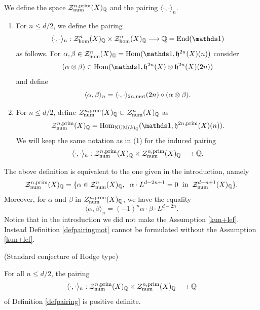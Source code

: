 \documentclass[11pt]{amsart}
\begin{document}
\begin{definition}\label{defpairing} We define  the space $\mathcal{Z}^{n,\mathrm{prim}}_{\mathrm{num}}(X)_{\mathbb{Q}} $  and the  pairing  $\langle \cdot, \cdot \rangle_{n}$.
\begin{enumerate}
\item For $n \leq d/2$, we  define the pairing
 \[\langle \cdot, \cdot \rangle_{n} : \mathcal{Z}^{n}_{\hom}(X)_{\Q}  \times  \mathcal{Z}^{n}_{\hom}(X)_{\Q}  \longrightarrow \Q=\End(\one)\]
as follows. For $\alpha, \beta  \in \mathcal{Z}^{n}_{\hom}(X)_{\Q}  = \Hom (\one, \mathfrak{h}^{2n}(X)(n))$ consider 
\[(\alpha \otimes \beta)  \in   \Hom (\one, \mathfrak{h}^{2n}(X) \otimes \mathfrak{h}^{2n}(X)(2n))\] and define
\[\langle \alpha, \beta \rangle_{n} =      \langle \cdot, \cdot \rangle_{2n,\mathrm{mot}} (2n) \circ  (\alpha \otimes \beta).\]

\item For $n \leq d/2$, define  $\mathcal{Z}^{n,\mathrm{prim}}_{\mathrm{num}}(X)_{\mathbb{Q}} \subset \mathcal{Z}^{n}_{\mathrm{num}}(X)_{\mathbb{Q}}$ as
 \[\mathcal{Z}^{n,\prim}_{\num}(X)_{\Q}  = \Hom_{\NUM(k)_\Q}(\one, \mathfrak{h}^{2n,\prim}(X)(n)).\]  We will keep the same notation as in (1) for the induced pairing
 \[\langle \cdot, \cdot \rangle_{n} : \mathcal{Z}^{n,\mathrm{prim}}_{\mathrm{num}}(X)_{\mathbb{Q}}  \times  \mathcal{Z}^{n,\mathrm{prim}}_{\mathrm{num}}(X)_{\mathbb{Q}}  \longrightarrow \mathbb{Q}.\]
\end{enumerate}
 \end{definition}
 \begin{remark}
The  above definition is equivalent to the one given in the introduction, namely 
\[\mathcal{Z}^{n,\mathrm{prim}}_{\mathrm{num}}(X)_{\mathbb{Q}} = \{\alpha \in \mathcal{Z}^{n}_{\mathrm{num}}(X)_{\mathbb{Q}} , \hspace{0.2cm} \alpha \cdot L^ {{d-2n+1}}=0 \hspace{0.2cm}  \textrm{in}  \hspace{0.2cm}  \mathcal{Z}^{d-n+1}_{\mathrm{num}}(X)_{\mathbb{Q}}\}.\]
Moreover,  for $\alpha$ and $\beta$ in $\mathcal{Z}^{n,\mathrm{prim}}_{\mathrm{num}}(X)_{\mathbb{Q}}$,  we have the equality \[\langle \alpha, \beta \rangle_{n} =  (-1)^n \alpha \cdot \beta \cdot L^{d-2n}.\]
 Notice that in the introduction we
 did not make the Assumption \ref{kun+lef}. Instead Definition \ref{defpairingmot} cannot be formulated without the  Assumption \ref{kun+lef}.
\end{remark}
\begin{conj}\label{conjscht} (Standard conjecture of Hodge type)

\noindent For all $n \leq d/2$, the pairing  \[\langle \cdot, \cdot \rangle_{n} : \mathcal{Z}^{n,\mathrm{prim}}_{\mathrm{num}}(X)_{\mathbb{Q}}  \times  \mathcal{Z}^{n,\mathrm{prim}}_{\mathrm{num}}(X)_{\mathbb{Q}}  \longrightarrow \mathbb{Q}\]
of Definition \ref{defpairing} is positive definite.
\end{conj}
\end{document}
